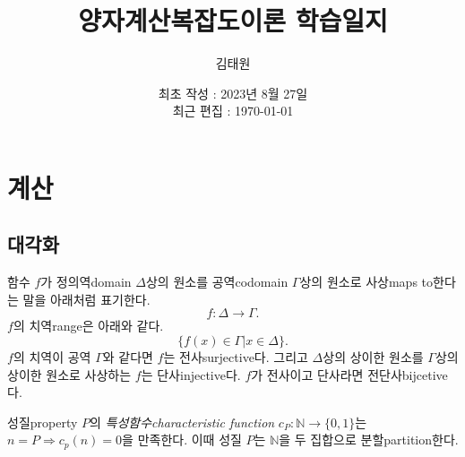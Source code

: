 \documentclass[a4paper,chapter,atbegshi]{oblivoir}
\title{양자계산복잡도이론 학습일지}
\author{김태원}
\date{최초 작성 : 2023년 8월 27일 \\ 최근 편집 : \today}
\begin{document}
\maketitle
\break
\tableofcontents
\chapter{계산}
\section{대각화}
함수 $f$가 정의역{\tiny domain} $\Delta$상의 원소를 공역{\tiny codomain} 
$\Gamma$상의 원소로 사상{\tiny maps to}한다는 말을 아래처럼 표기한다.
\[
  f:\Delta\rightarrow\Gamma.
\]
$f$의 치역{\tiny range}은 아래와 같다.
\[
  \{f(x)\in\Gamma|x\in\Delta\}.
\]
$f$의 치역이 공역 $\Gamma$와 같다면 $f$는 전사{\tiny surjective}다.
그리고 $\Delta$상의 상이한 원소를 $\Gamma$상의 상이한 원소로 사상하는 $f$는
단사{\tiny injective}다. $f$가 전사이고 단사라면 전단사{\tiny bijcetive}다.

성질{\tiny property} $P$의 \emph{특성함수\tiny characteristic function}
$c_P:\mathbb{N}\rightarrow\{0,1\}$는 $n=P\Rightarrow c_p(n)=0$을 만족한다. 
이때 성질 $P$는 $\mathbb{N}$을 두 집합으로 분할{\tiny partition}한다.
\end{document}
